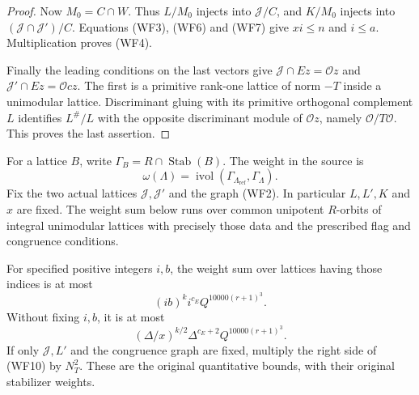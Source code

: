 \begin{proof}
Now $M_0=C\cap W$.  Thus $L/M_0$ injects into
$\mathcal J/C$, and $K/M_0$ injects into
$(\mathcal J\cap\mathcal J')/C$.
Equations (WF3), (WF6) and (WF7) give $xi\leq n$ and
$i\leq a$.  Multiplication proves (WF4).

Finally the leading conditions on the last vectors give
$\mathcal J\cap Ez=\mathcal O z$ and
$\mathcal J'\cap Ez=\mathcal O cz$.
The first is a primitive rank-one lattice of norm $-T$
inside a unimodular lattice.  Discriminant gluing with
its primitive orthogonal complement $L$ identifies
$L^\#/L$ with the opposite discriminant module of
$\mathcal O z$, namely $\mathcal O/T\mathcal O$.
This proves the last assertion.
\end{proof}

For a lattice $B$, write $\Gamma_B=R\cap\operatorname{Stab}(B)$.
The weight in the source is
\[
           \omega(\Lambda)=
           \operatorname{ivol}(\Gamma_{\Lambda_{\mathrm{ref}}},
                               \Gamma_\Lambda).
 \tag{WF8}
\]
Fix the two actual lattices $\mathcal J,\mathcal J'$
and the graph (WF2).  In particular $L,L',K$ and $x$
are fixed.  The weight sum below runs over common
unipotent $R$-orbits of integral unimodular lattices
with precisely those data and the prescribed flag and
congruence conditions.

\begin{theorem}
\label{thm:fixed-normal-form-weighted-sum}
For specified positive integers $i,b$, the weight sum
over lattices having those indices is at most
\[
                  (ib)^k i^{c_E}Q^{10000(r+1)^3}.
 \tag{WF9}
\]
Without fixing $i,b$, it is at most
\[
              (\Delta/x)^{k/2}\Delta^{c_E+2}
                                     Q^{10000(r+1)^3}.
 \tag{WF10}
\]
If only $\mathcal J,L'$ and the congruence graph are
fixed, multiply the right side of (WF10) by $N_T^2$.
These are the original quantitative bounds, with their
original stabilizer weights.
\end{theorem}

